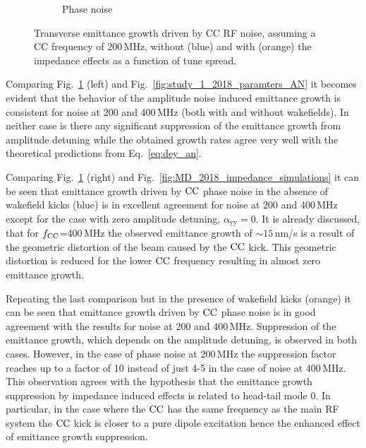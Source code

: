 \begin{figure}[!ht]
\begin{subfigure}[t]{0.45\textwidth}
        \caption{Phase noise}
    \end{subfigure}
    \hfill
     \caption{Transverse emittance growth driven by CC RF noise, assuming a CC frequency of 200\,MHz, without (blue) and with (orange) the impedance effects as a function of tune spread.} %
     \label{fig:CC_200MHz_amplitude_phase_noise}
 \end{figure}
 
 
 Comparing Fig.~\ref{fig:CC_200MHz_amplitude_phase_noise} (left) and Fig.~\ref{fig:study_1_2018_paramters_AN} it becomes evident that the behavior of the amplitude noise induced emittance growth is consistent for noise at 200 and 400\,MHz (both with and without wakefields). In neither case is there any significant suppression of the emittance growth from amplitude detuning while the obtained growth rates agree very well with the theoretical predictions from Eq.~\eqref{eq:dey_an}.
 
 Comparing Fig.~\ref{fig:CC_200MHz_amplitude_phase_noise} (right) and Fig.~\ref{fig:MD_2018_impedance_simulations} it can be seen that emittance growth driven by ${\mathrm{CC}}$ phase noise in the absence of wakefield kicks (blue) is in excellent agreement for noise at 200 and 400\,MHz except for the case with zero amplitude detuning, $\alpha_\mathrm{yy}=0$. It is already discussed, that for ${f_\mathrm{CC}}$=400\,MHz the observed emittance growth of $\sim 15$\,nm/s is a result of the geometric distortion of the beam caused by the ${\mathrm{CC}}$ kick. This geometric distortion is reduced for the lower ${\mathrm{CC}}$ frequency resulting in almost zero emittance growth. 

 Repeating the last comparison but in the presence of wakefield kicks (orange) it can be seen that emittance growth driven by ${\mathrm{CC}}$ phase noise is in good agreement with the results for noise at 200 and 400\,MHz. Suppression of the emittance growth, which depends on the amplitude detuning, is observed in both cases. However, in the case of phase noise at 200\,MHz the suppression factor reaches up to a factor of 10 instead of just 4-5 in the case of noise at 400\,MHz. This observation agrees with the hypothesis that the emittance growth suppression by impedance induced effects is related to head-tail mode 0. In particular, in the case where the ${\mathrm{CC}}$ has the same frequency as the main RF system the ${\mathrm{CC}}$ kick is closer to a pure dipole excitation hence the enhanced effect of emittance growth suppression.

 



